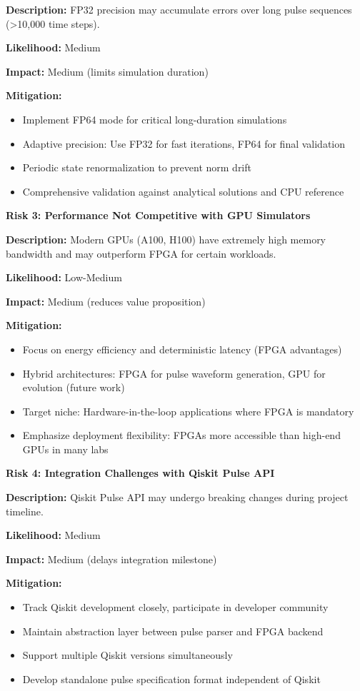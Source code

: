 \documentclass[12pt,a4paper]{article}
\begin{document}
\textbf{Description:} FP32 precision may accumulate errors over long pulse sequences (>10,000 time steps).

\textbf{Likelihood:} Medium

\textbf{Impact:} Medium (limits simulation duration)

\textbf{Mitigation:}
\begin{itemize}[noitemsep]
\item Implement FP64 mode for critical long-duration simulations
\item Adaptive precision: Use FP32 for fast iterations, FP64 for final validation
\item Periodic state renormalization to prevent norm drift
\item Comprehensive validation against analytical solutions and CPU reference
\end{itemize}

\textbf{Risk 3: Performance Not Competitive with GPU Simulators}

\textbf{Description:} Modern GPUs (A100, H100) have extremely high memory bandwidth and may outperform FPGA for certain workloads.

\textbf{Likelihood:} Low-Medium

\textbf{Impact:} Medium (reduces value proposition)

\textbf{Mitigation:}
\begin{itemize}[noitemsep]
\item Focus on energy efficiency and deterministic latency (FPGA advantages)
\item Hybrid architectures: FPGA for pulse waveform generation, GPU for evolution (future work)
\item Target niche: Hardware-in-the-loop applications where FPGA is mandatory
\item Emphasize deployment flexibility: FPGAs more accessible than high-end GPUs in many labs
\end{itemize}

\textbf{Risk 4: Integration Challenges with Qiskit Pulse API}

\textbf{Description:} Qiskit Pulse API may undergo breaking changes during project timeline.

\textbf{Likelihood:} Medium

\textbf{Impact:} Medium (delays integration milestone)

\textbf{Mitigation:}
\begin{itemize}[noitemsep]
\item Track Qiskit development closely, participate in developer community
\item Maintain abstraction layer between pulse parser and FPGA backend
\item Support multiple Qiskit versions simultaneously
\item Develop standalone pulse specification format independent of Qiskit
\end{itemize}
\end{document}
